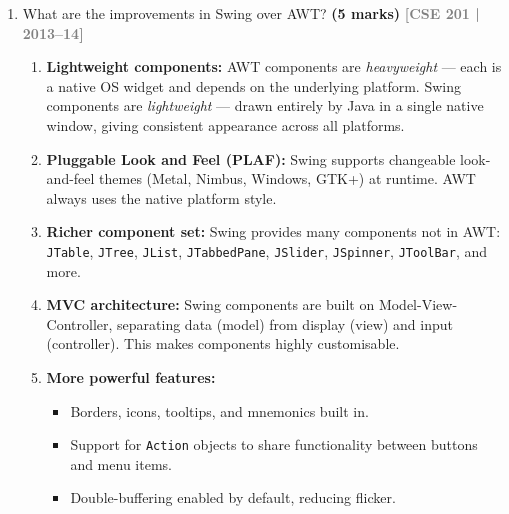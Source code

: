 \documentclass[12pt,a3paper]{article}
\newcommand{\yr}[1]{\hfill\textcolor{gray}{\small\textbf{[#1]}}}
\newcommand{\mk}[1]{\textcolor{orange!70!black}{\small\textbf{(#1 marks)}}}
\begin{document}
\begin{enumerate}





\item What are the improvements in Swing over AWT? \mk{5}
\yr{CSE 201 | 2013--14}

\begin{tcolorbox}[enhanced,breakable,ansbox,
  colback=cC!4,colframe=cC,boxrule=0.8pt,arc=5pt,
  title={\textbf{Answer — Improvements of Swing Over
  AWT}},
  fonttitle=\bfseries\color{white},colbacktitle=cC]

\begin{enumerate}[label=\textbf{\arabic*.}, itemsep=3pt]
  \item \textbf{Lightweight components:} AWT
  components are \emph{heavyweight} --- each is a
  native OS widget and depends on the underlying
  platform. Swing components are
  \emph{lightweight} --- drawn entirely by Java in
  a single native window, giving consistent
  appearance across all platforms.

  \item \textbf{Pluggable Look and Feel (PLAF):}
  Swing supports changeable look-and-feel themes
  (Metal, Nimbus, Windows, GTK+) at runtime. AWT
  always uses the native platform style.

  \item \textbf{Richer component set:} Swing
  provides many components not in AWT:
  \texttt{JTable}, \texttt{JTree}, \texttt{JList},
  \texttt{JTabbedPane}, \texttt{JSlider},
  \texttt{JSpinner}, \texttt{JToolBar}, and more.

  \item \textbf{MVC architecture:} Swing components
  are built on Model-View-Controller, separating
  data (model) from display (view) and input
  (controller). This makes components highly
  customisable.

  \item \textbf{More powerful features:}
  \begin{itemize}[itemsep=1pt]
    \item Borders, icons, tooltips, and mnemonics
    built in.
    \item Support for \texttt{Action} objects
    to share functionality between buttons and
    menu items.
    \item Double-buffering enabled by default,
    reducing flicker.
  \end{itemize}


\end{enumerate}
\end{tcolorbox}
\end{enumerate}
\end{document}
